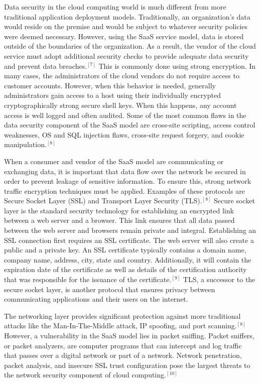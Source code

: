 \documentclass[a4paper, 8pt]{article} %
\begin{document}
\begin{doublespacing}
Data security in the cloud computing world is much different from more traditional application deployment models.  Traditionally, an organization's data would reside on the premise and would be subject to whatever security policies were deemed necessary.  However, using the SaaS service model, data is stored outside of the boundaries of the organization.  As a result, the vendor of the cloud service must adopt additional security checks to provide adequate data security and prevent data breaches.$^{[7]}$  This is commonly done using strong encryption.  In many cases, the administrators of the cloud vendors do not require access to customer accounts.  However, when this behavior is needed, generally administrators gain access to a host using their individually encrypted cryptographically strong secure shell keys.  When this happens, any account access is well logged and often audited.  Some of the most common flaws in the data security component of the SaaS model are cross-site scripting, access control weaknesses, OS and SQL injection flaws, cross-site request forgery, and cookie manipulation.$^{[8]}$  

When a consumer and vendor of the SaaS model are communicating or exchanging data, it is important that data flow over the network be secured in order to prevent leakage of sensitive information.  To ensure this, strong network traffic encryption techniques must be applied.  Examples of these protocols are Secure Socket Layer (SSL) and Transport Layer Security (TLS).$^{[8]}$  Secure socket layer is the standard security technology for establishing an encrypted link between a web server and a browser.  This link ensures that all data passed between the web server and browsers remain private and integral.  Establishing an SSL connection first requires an SSL certificate.  The web server will also create a public and a private key.  An SSL certificate typically contains a domain name, company name, address, city, state and country.  Additionally, it will contain the expiration date of the certificate as well as details of the certification authority that was responsible for the issuance of the certificate.$^{[9]}$  TLS, a successor to the secure socket layer, is another protocol that ensures privacy between communicating applications and their users on the internet.  

The networking layer provides significant protection against more traditional attacks like the Man-In-The-Middle attack, IP spoofing, and port scanning.$^{[8]}$  However, a vulnerability in the SaaS model lies in packet sniffing.  Packet sniffers, or packet analyzers, are computer programs that can intercept and log traffic that passes over a digital network or part of a network.  Network penetration, packet analysis, and insecure SSL trust configuration pose the largest threats to the network security component of cloud computing.$^{[10]}$  


\end{doublespacing}
\end{document}
